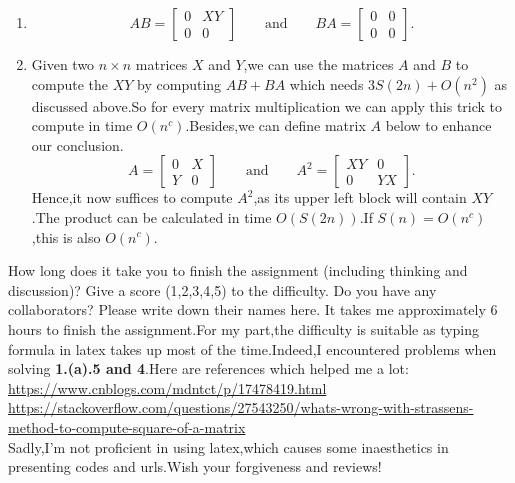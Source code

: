 \documentclass{oxmathproblems}
\begin{document}
\begin{questions}
\begin{parts}
\begin{enumerate}
        \item 
        $$AB=\left[\begin{array}{cc}
            0 & XY \\
            0 & 0
        \end{array}\right]\qquad\mbox{and}\qquad BA=\left[\begin{array}{cc}
            0 & 0 \\
            0 & 0
        \end{array}\right].$$
        \item Given two $n\times n$ matrices $X$ and $Y$,we can
        use the matrices $A$ and $B$ to compute the $XY$ by computing $AB+BA$ which needs $3S(2n)+O(n^2)$ as discussed above.So for every matrix multiplication we can apply this trick to compute in time $O(n^c)$.Besides,we can define matrix $A$ below to enhance our conclusion.
        $$A=\left[\begin{array}{cc}
            0 & X \\
            Y & 0
        \end{array}\right]\qquad\mbox{and}\qquad A^2=\left[\begin{array}{cc}
            XY & 0 \\
            0 & YX
        \end{array}\right].$$
        Hence,it now suffices to compute $A^2$,as its upper left block will contain $XY$.The product can be calculated in time $O(S(2n))$.If $S(n)=O(n^c)$,this is also $O(n^c)$.
    \end{enumerate}
\end{parts}

\miquestion
How long does it take you to finish the assignment (including thinking and discussion)?
Give a score (1,2,3,4,5) to the difficulty.
Do you have any collaborators?
Please write down their names here.\newline
It takes me approximately 6 hours to finish the assignment.For my part,the difficulty is suitable as typing formula in latex takes up most of the time.Indeed,I encountered problems when solving \textbf{1.(a).5 and 4}.Here are references which helped me a lot:\\
\href{https://www.cnblogs.com/mdntct/p/17478419.html}{https://www.cnblogs.com/mdntct/p/17478419.html}\\
\href{https://stackoverflow.com/questions/27543250/whats-wrong-with-strassens-method-to-compute-square-of-a-matrix}{https://stackoverflow.com/questions/27543250/whats-wrong-with-strassens-method-to-compute-square-of-a-matrix}\\
Sadly,I'm not proficient in using latex,which causes some inaesthetics in presenting codes and urls.Wish your forgiveness and reviews!

\end{questions}
\end{document}

